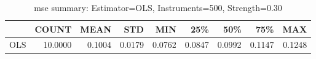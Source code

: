 \begin{table}[ht]
\centering
\caption{mse summary: Estimator=OLS, Instruments=500, Strength=0.30}
\begin{tabular}{lrrrrrrrr}
\toprule
 & COUNT & MEAN & STD & MIN & 25\% & 50\% & 75\% & MAX \\
\midrule
OLS & 10.0000 & 0.1004 & 0.0179 & 0.0762 & 0.0847 & 0.0992 & 0.1147 & 0.1248 \\
\bottomrule
\end{tabular}
\end{table}
